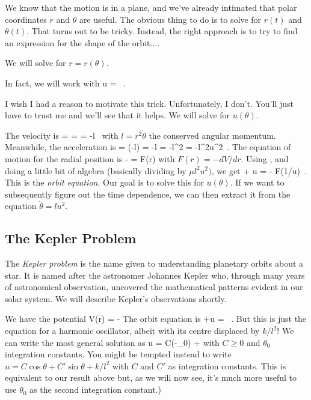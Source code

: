   
 \para
We know that the motion is in a plane, and we've already intimated that polar coordinates $r$ and $\theta$ are useful. The obvious thing to do is to   solve for $r(t)$ and $\theta(t)$. That turns out to be tricky. Instead, the right approach is to try to find an expression for the shape of the orbit....{\co We will solve for $r=r(\theta)$. 

\para
In fact, we will work with 
%
\be u = \ .\ee
%
}
I wish I had a reason to motivate this trick. Unfortunately, I don't. You'll just have to trust me and we'll see that it helps. We will solve for $u(\theta)$. 

\para
{\co The velocity is
%
\be {} =  \dot{\theta} =   = -l\ \ee
%
with $l=r^2\dot{\theta}$ the conserved angular momentum. 
Meanwhile, the acceleration is 
%
\be {} = \left(-l\right)  = -l\dot{\theta} = -l^2 = -l^2u^2\ .\label{uac}\ee
%
The equation of motion for the radial position is
%
\be \mu {} -  = F(r)\ee
%
with  $F(r) = -dV/dr$.}  Using , and doing a little bit of algebra (basically dividing by $\mu l^2u^2)$, {\co we get 
%
\be {} + u = - F(1/u)\ .\label{orbit}\ee
%
This is the {\it orbit equation}.} Our goal is to solve this for $u(\theta)$. If we want to subsequently figure out the time dependence, we can then extract it from the equation  $\dot{\theta} = lu^2$.

\subsection{The Kepler Problem}

The {\it Kepler problem} is the name given to understanding planetary orbits about a star. It is named after the astronomer Johannes Kepler who, through many years of astronomical observation, uncovered the mathematical patterns evident in our solar system. We will describe Kepler's observations shortly.

\para
{\co We have the potential 
%
\be V(r)  = -\label{burnt}\ee
%
The orbit equation is
%
\be {} +u = \ .\label{orbitfork}\ee
%
But this is just the equation for a harmonic oscillator, albeit with its centre displaced by $k/l^2$! We can write the most general solution as 
%
\be u = C\cos\left(\theta-\theta_0\right) + \label{thankwells}\ee
%
with $C\geq 0$ and $\theta_0$ integration constants. } You might be tempted instead to write $u=C\cos\theta + C'\sin\theta +k/l^2$ with $C$ and $C'$ as integration constants. This is equivalent to our result above but, as we will now see, it's much more useful to use $\theta_0$ as the second integration constant.)

